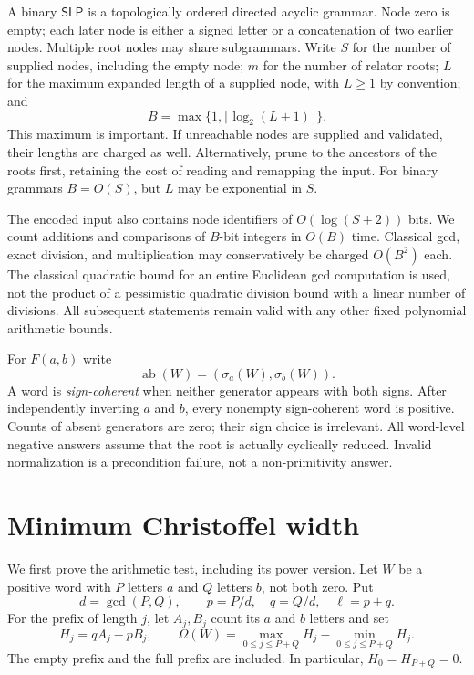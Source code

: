 \documentclass[11pt,letterpaper]{article}
\theoremstyle{definition}
\newcommand{\ab}{\operatorname{ab}}
\newcommand{\SLP}{\mathsf{SLP}}
\begin{document}
A binary $\SLP$ is a topologically ordered directed acyclic grammar. Node zero
is empty; each later node is either a signed letter or a concatenation of two
earlier nodes. Multiple root nodes may share subgrammars. Write $S$ for the
number of supplied nodes, including the empty node; $m$ for the number of
relator roots; $L$ for the maximum expanded length of a supplied node, with
$L\geq1$ by convention; and
\[
 B=\max\{1,\lceil\log_2(L+1)\rceil\}.
\]
This maximum is important. If unreachable nodes are supplied and validated,
their lengths are charged as well. Alternatively, prune to the ancestors of
the roots first, retaining the cost of reading and remapping the input.
For binary grammars $B=O(S)$, but $L$ may be exponential in $S$.

The encoded input also contains node identifiers of $O(\log(S+2))$ bits.
We count additions and comparisons of $B$-bit integers in $O(B)$ time.
Classical gcd, exact division, and multiplication may conservatively be
charged $O(B^2)$ each. The classical quadratic bound for an entire Euclidean
gcd computation is used, not the product of a pessimistic quadratic division
bound with a linear number of divisions. All subsequent statements remain
valid with any other fixed polynomial arithmetic bounds.

For $F(a,b)$ write
\[
 \ab(W)=(\sigma_a(W),\sigma_b(W)).
\]
A word is \emph{sign-coherent} when neither generator appears with both signs.
After independently inverting $a$ and $b$, every nonempty sign-coherent word
is positive. Counts of absent generators are zero; their sign choice is
irrelevant. All word-level negative answers assume that the root is actually
cyclically reduced. Invalid normalization is a precondition failure, not a
non-primitivity answer.

\section{Minimum Christoffel width}
\label{sec:width}
We first prove the arithmetic test, including its power version. Let $W$ be a
positive word with $P$ letters $a$ and $Q$ letters $b$, not both zero. Put
\[
 d=\gcd(P,Q),\qquad p=P/d,\quad q=Q/d,\quad \ell=p+q.
\]
For the prefix of length $j$, let $A_j,B_j$ count its $a$ and $b$ letters and
set
\begin{equation}
 H_j=qA_j-pB_j,\qquad
 \Omega(W)=\max_{0\leq j\leq P+Q}H_j-
            \min_{0\leq j\leq P+Q}H_j.
 \label{eq:height}
\end{equation}
The empty prefix and the full prefix are included. In particular,
$H_0=H_{P+Q}=0$.
\end{document}
